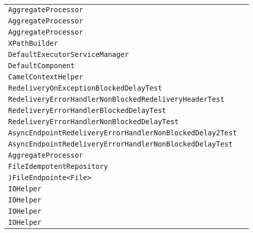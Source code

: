 \begin{center}
\begin{tabular}{ll}
\lstinline/AggregateProcessor/&\raisebox{0pt}{\lstinline/doForceCompletionOnStop()/}\\
\lstinline/AggregateProcessor/&\raisebox{0pt}{\lstinline/doStart()/}\\
\lstinline/AggregateProcessor/&\raisebox{0pt}{\lstinline/intforceCompletionOfAllGroups()/}\\
\lstinline/XPathBuilder/&\raisebox{0pt}{\lstinline/XPathExpressioncreateXPathExpression()}\\
\lstinline/DefaultExecutorServiceManager/&\raisebox{0pt}{\lstinline/doShutdown()/}\\
\lstinline/DefaultComponent/&\raisebox{0pt}{\lstinline/StringpreProcessUri(Stringuri)/}\\
\lstinline/CamelContextHelper/&\raisebox{0pt}{\lstinline/ComponentlookupPropertiesComponent(CamelContext)/}\\
\lstinline/RedeliveryOnExceptionBlockedDelayTest/&\raisebox{0pt}{\lstinline/process(Exchange)/}\\
\lstinline/RedeliveryErrorHandlerNonBlockedRedeliveryHeaderTest/&\raisebox{0pt}{\lstinline/process(Exchange)/}\\
\lstinline/RedeliveryErrorHandlerBlockedDelayTest/&\raisebox{0pt}{\lstinline/process(Exchange)/}\\
\lstinline/RedeliveryErrorHandlerNonBlockedDelayTest/&\raisebox{0pt}{\lstinline/process(Exchange)/}\\
\lstinline/AsyncEndpointRedeliveryErrorHandlerNonBlockedDelay2Test/&\raisebox{0pt}{\lstinline/process(Exchange)/}\\
\lstinline/AsyncEndpointRedeliveryErrorHandlerNonBlockedDelayTest/&\raisebox{0pt}{\lstinline/process(Exchange)/}\\
\lstinline/AggregateProcessor/&\raisebox{0pt}{\lstinline/doStart()/}\\
\lstinline/FileIdempotentRepository/&\raisebox{0pt}{\lstinline/appendToStore(StringId)/}\\
\lstinline/)FileEndpointe<File>/&\raisebox{0pt}{\lstinline/FileConsumercreateConsumer(Processorprocessor)/}\\
\lstinline/IOHelper/&\raisebox{0pt}{\lstinline/force(FileOutputStreamo,String,Logger)/}\\
\lstinline/IOHelper/&\raisebox{0pt}{\lstinline/close(Closeable,String,Logger)/}\\
\lstinline/IOHelper/&\raisebox{0pt}{\lstinline/force(FileChannel,String,Logger)/}\\
\lstinline/IOHelper/&\raisebox{0pt}{\lstinline/close(Writer)/}\\

\end{tabular}
\end{center}
